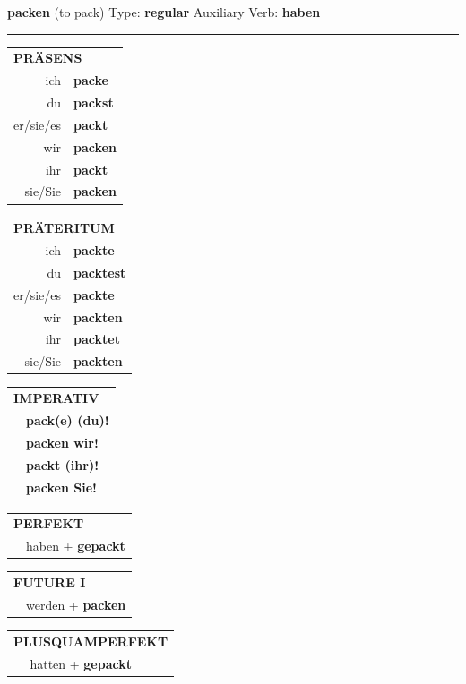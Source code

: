 \documentclass[10pt,a4paper]{revtex4-2}
\begin{document}
\begin{verbbox}
{\Large \bf packen} (to pack) \hfill Type: \textbf{regular} \hfill Auxiliary Verb: \textbf{haben}

\vspace{5pt}
\hrule
\vspace{5pt}

\begin{tabular}{rl}
\multicolumn{2}{l}{\textbf{PRÄSENS}}\\
ich & \textbf{packe}\\
du & \textbf{packst}\\
er/sie/es & \textbf{packt}\\
wir & \textbf{packen}\\
ihr & \textbf{packt}\\
sie/Sie & \textbf{packen}\\
\end{tabular}
\hfill
\begin{tabular}{rl}
\multicolumn{2}{l}{\textbf{PRÄTERITUM}}\\
ich & \textbf{packte}\\
du & \textbf{packtest}\\
er/sie/es & \textbf{packte}\\
wir & \textbf{packten}\\
ihr & \textbf{packtet}\\
sie/Sie & \textbf{packten}\\
\end{tabular}
\hfill
\begin{tabular}{rl}
\multicolumn{2}{l}{\textbf{IMPERATIV}}\\
& \textbf{pack(e) (du)!}\\
& \textbf{packen wir!}\\
& \textbf{packt (ihr)!}\\
& \textbf{packen Sie!}\\
\end{tabular}

\vspace{10pt}

\begin{tabular}{rl}
\multicolumn{2}{l}{\textbf{PERFEKT}}\\
& haben + \textbf{gepackt}\\
\end{tabular}
\hfill
\begin{tabular}{rl}
\multicolumn{2}{l}{\textbf{FUTURE I}}\\
& werden + \textbf{packen}\\
\end{tabular}
\hfill
\begin{tabular}{rl}
\multicolumn{2}{l}{\textbf{PLUSQUAMPERFEKT}}\\
& hatten + \textbf{gepackt}\\
\end{tabular}


\end{verbbox}
\end{document}
